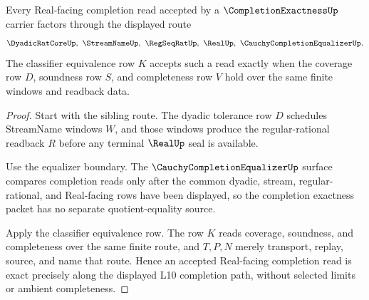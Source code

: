 \begin{theorem}
\label{thm:completion-exactness-real-route}
Every Real-facing completion read accepted by a $\CompletionExactnessUp$ carrier factors through the displayed route
$$
\DyadicRatCoreUp,\ \StreamNameUp,\ \RegSeqRatUp,\ \RealUp,\ \CauchyCompletionEqualizerUp .
$$
The classifier equivalence row $K$ accepts such a read exactly when the coverage row $D$, soundness row $S$, and completeness row $V$ hold over the same finite windows and readback data.
\end{theorem}
\begin{proof}
Start with the sibling route. The dyadic tolerance row $D$ schedules StreamName windows $W$, and those windows produce the regular-rational readback $R$ before any terminal $\RealUp$ seal is available.

Use the equalizer boundary. The $\CauchyCompletionEqualizerUp$ surface compares completion reads only after the common dyadic, stream, regular-rational, and Real-facing rows have been displayed, so the completion exactness packet has no separate quotient-equality source.

Apply the classifier equivalence row. The row $K$ reads coverage, soundness, and completeness over the same finite route, and $T,P,N$ merely transport, replay, source, and name that route. Hence an accepted Real-facing completion read is exact precisely along the displayed L10 completion path, without selected limits or ambient completeness.
\end{proof}


\begin{closurestatus}{\CompletionExactnessUp}
  \theoryclosure{\seedClosure}
  \formalstatus{\unformalizedV}
\end{closurestatus}

